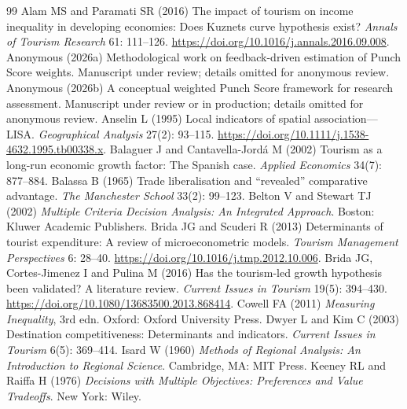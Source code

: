\documentclass[11pt,a4paper]{article}
\theoremstyle{plain}\newtheorem{proposition}{Proposition}
\theoremstyle{definition}\newtheorem{definition}{Definition}
\begin{document}

\begin{thebibliography}{99}\small
{} Alam MS and Paramati SR (2016) The impact of tourism on income inequality in developing economies: Does Kuznets curve hypothesis exist? \emph{Annals of Tourism Research} 61: 111--126. \url{https://doi.org/10.1016/j.annals.2016.09.008}.
 Anonymous (2026a) Methodological work on feedback-driven estimation of Punch Score weights. Manuscript under review; details omitted for anonymous review.
 Anonymous (2026b) A conceptual weighted Punch Score framework for research assessment. Manuscript under review or in production; details omitted for anonymous review.
 Anselin L (1995) Local indicators of spatial association---LISA. \emph{Geographical Analysis} 27(2): 93--115. \url{https://doi.org/10.1111/j.1538-4632.1995.tb00338.x}.
 Balaguer J and Cantavella-Jord\'a M (2002) Tourism as a long-run economic growth factor: The Spanish case. \emph{Applied Economics} 34(7): 877--884.
 Balassa B (1965) Trade liberalisation and ``revealed'' comparative advantage. \emph{The Manchester School} 33(2): 99--123.
 Belton V and Stewart TJ (2002) \emph{Multiple Criteria Decision Analysis: An Integrated Approach}. Boston: Kluwer Academic Publishers.
 Brida JG and Scuderi R (2013) Determinants of tourist expenditure: A review of microeconometric models. \emph{Tourism Management Perspectives} 6: 28--40. \url{https://doi.org/10.1016/j.tmp.2012.10.006}.
 Brida JG, Cortes-Jimenez I and Pulina M (2016) Has the tourism-led growth hypothesis been validated? A literature review. \emph{Current Issues in Tourism} 19(5): 394--430. \url{https://doi.org/10.1080/13683500.2013.868414}.
 Cowell FA (2011) \emph{Measuring Inequality}, 3rd edn. Oxford: Oxford University Press.
 Dwyer L and Kim C (2003) Destination competitiveness: Determinants and indicators. \emph{Current Issues in Tourism} 6(5): 369--414.
 Isard W (1960) \emph{Methods of Regional Analysis: An Introduction to Regional Science}. Cambridge, MA: MIT Press.
 Keeney RL and Raiffa H (1976) \emph{Decisions with Multiple Objectives: Preferences and Value Tradeoffs}. New York: Wiley.

\end{thebibliography}
\end{document}
